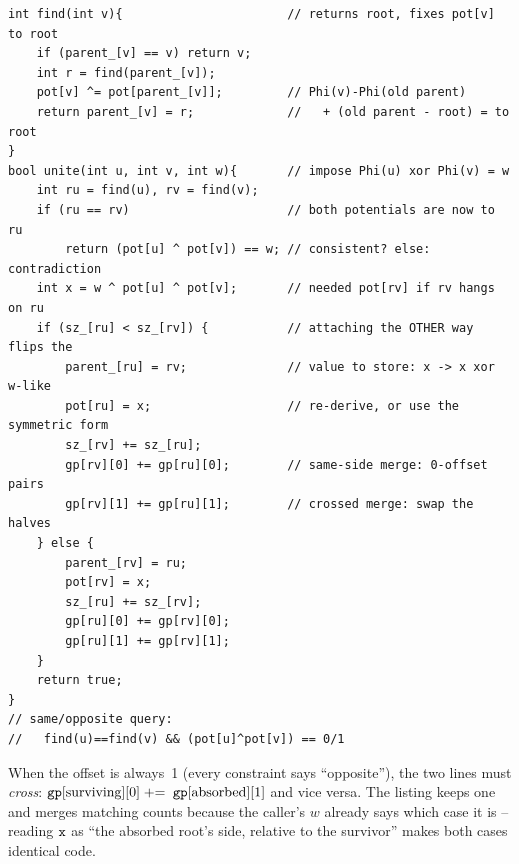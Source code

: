 \begin{lstlisting}[caption={find and unite with potentials (parity shown; any abelian group works by replacing xor with +/-)}, label={lst:c28-weighted}]
int find(int v){                       // returns root, fixes pot[v] to root
    if (parent_[v] == v) return v;
    int r = find(parent_[v]);
    pot[v] ^= pot[parent_[v]];         // Phi(v)-Phi(old parent)
    return parent_[v] = r;             //   + (old parent - root) = to root
}
bool unite(int u, int v, int w){       // impose Phi(u) xor Phi(v) = w
    int ru = find(u), rv = find(v);
    if (ru == rv)                      // both potentials are now to ru
        return (pot[u] ^ pot[v]) == w; // consistent? else: contradiction
    int x = w ^ pot[u] ^ pot[v];       // needed pot[rv] if rv hangs on ru
    if (sz_[ru] < sz_[rv]) {           // attaching the OTHER way flips the
        parent_[ru] = rv;              // value to store: x -> x xor w-like
        pot[ru] = x;                   // re-derive, or use the symmetric form
        sz_[rv] += sz_[ru];
        gp[rv][0] += gp[ru][0];        // same-side merge: 0-offset pairs
        gp[rv][1] += gp[ru][1];        // crossed merge: swap the halves
    } else {
        parent_[rv] = ru;
        pot[rv] = x;
        sz_[ru] += sz_[rv];
        gp[ru][0] += gp[rv][0];
        gp[ru][1] += gp[rv][1];
    }
    return true;
}
// same/opposite query:
//   find(u)==find(v) && (pot[u]^pot[v]) == 0/1
\end{lstlisting}

When the offset is always~1 (every constraint says ``opposite''), the two
 lines must \emph{cross}: \(\texttt{gp}[\text{surviving}][0]\mathrel{+}=\)
\(\texttt{gp}[\text{absorbed}][1]\) and vice versa.  The listing keeps one
 and merges matching counts because the caller's \(w\) already says
which case it is -- reading \(\texttt{x}\) as ``the absorbed root's side,
relative to the survivor'' makes both cases identical code.

